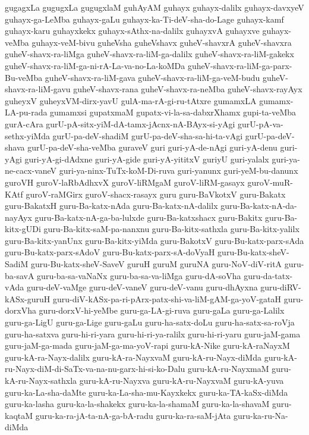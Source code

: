 {gugagxLa
gugugxLa
gugugxlaM
guhAyAM
guhayx
guhayx-dalilx
guhayx-davxyeV
guhayx-ga-LeMba
guhayx-gaLu
guhayx-ka-Ti-deV-sha-do-Lage
guhayx-kamf
guhayx-karu
guhayxkekx
guhayx-sAthx-na-dalilx
guhayxvA
guhayxve
guhayx-veMba
guhayx-veM-bivu
guheVsha
guheVshavx
guheV-shavxrA
guheV-shavxra
guheV-shavx-ra-liMga
guheV-shavx-ra-liM-ga-dalilx
guheV-shavx-ra-liM-gakekx
guheV-shavx-ra-liM-ga-ni-rA-La-va-no-La-koMDa
guheV-shavx-ra-liM-ga-parx-Bu-veMba
guheV-shavx-ra-liM-gava
guheV-shavx-ra-liM-ga-veM-budu
guheV-shavx-ra-liM-gavu
guheV-shavx-rana
guheV-shavx-ra-neMba
guheV-shavx-rayAyx
guheyxV
guheyxVM-dirx-yavU
gulA-ma-rA-gi-ru-tAtxre
gumamxLA
gumamx-LA-pu-rada
gumamxsi
gupatxmaM
gupatx-vi-la-sa-dabxrXhamx
gupi-ta-veMba
gurA-cAra
gurU-pA-sitx-yiM-dA-tamx-jAcnx-nA-BAyx-si-yAgi
gurU-pA-va-sethx-yiMda
gurU-pa-deV-shadiM
gurU-pa-deV-sha-sa-hi-ta-vAgi
gurU-pa-deV-shava
gurU-pa-deV-sha-veMba
guraveV
guri
guri-yA-de-nAgi
guri-yA-denu
guri-yAgi
guri-yA-gi-dAdxne
guri-yA-gide
guri-yA-yititxV
guriyU
guri-yalalx
guri-ya-ne-cacx-vaneV
guri-ya-ninx-TuTx-koM-Di-ruva
guri-yanunx
guri-yeM-bu-danunx
guroVH
guroV-laRbAdhxvX
guroV-liRMgaM
guroV-liRM-gasayx
guroV-muR-KAtf
guroV-raMGirx
guroV-shacx-rasayx
guru
guru-BaVkotxV
guru-Bakatx
guru-BakatxH
guru-Ba-katx-nAda
guru-Ba-katx-nA-dalilx
guru-Ba-katx-nA-da-nayAyx
guru-Ba-katx-nA-ga-ba-lulxde
guru-Ba-katxshacx
guru-Bakitx
guru-Ba-kitx-gUDi
guru-Ba-kitx-saM-pa-nanxnu
guru-Ba-kitx-sathxla
guru-Ba-kitx-yalilx
guru-Ba-kitx-yanUnx
guru-Ba-kitx-yiMda
guru-BakotxV
guru-Bu-katx-parx-sAda
guru-Bu-katx-parx-sAdoV
guru-Bu-katx-parx-sA-doVyaH
guru-Bu-katx-sheV-SadiM
guru-Bu-katx-sheV-SaveV
guruH
guruM
guruNA
guru-NoV-diV-ritA
guru-ba-savA
guru-ba-sa-vaNaNx
guru-ba-sa-va-liMga
guru-dA-soVha
guru-da-tatx-vAda
guru-deV-vaMge
guru-deV-vaneV
guru-deV-vanu
guru-dhAyxna
guru-diRV-kASx-guruH
guru-diV-kASx-pa-ri-pArx-patx-shi-va-liM-gAM-ga-yoV-gataH
guru-dorxVha
guru-dorxV-hi-yeMbe
guru-ga-LA-gi-ruva
guru-gaLa
guru-ga-Lalilx
guru-ga-LigU
guru-ga-Lige
guru-gaLu
guru-ha-satx-doLu
guru-ha-satx-sa-roVja
guru-ha-satxva
guru-hi-ri-yara
guru-hi-ri-ya-ralilx
guru-hi-ri-yaru
guru-jaM-gama
guru-jaM-ga-mada
guru-jaM-ga-ma-yoV-rapi
guru-kA-Nike
guru-kA-raNayxM
guru-kA-ra-Nayx-dalilx
guru-kA-ra-NayxvaM
guru-kA-ru-Nayx-diMda
guru-kA-ru-Nayx-diM-di-SaTx-va-na-nu-garx-hi-si-ko-Dalu
guru-kA-ru-NayxmaM
guru-kA-ru-Nayx-sathxla
guru-kA-ru-Nayxva
guru-kA-ru-NayxvaM
guru-kA-yuva
guru-ka-La-sha-daMte
guru-ka-La-sha-mu-Kayxkekx
guru-ka-TA-kaSx-diMda
guru-ka-lasha
guru-ka-la-shakekx
guru-ka-la-shamaM
guru-ka-la-shavaM
guru-kaqtaM
guru-ka-ra-jA-ta-nA-ga-bA-radu
guru-ka-ra-saM-jAta
guru-ka-ru-Na-diMda
}
